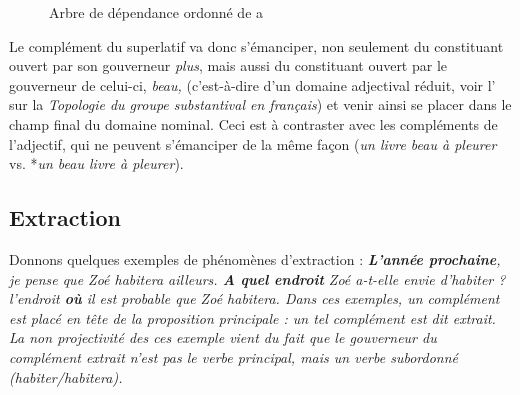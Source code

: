\begin{figure}
\caption{\label{fig:plus}Arbre de dépendance ordonné de a}
\end{figure}

Le complément du superlatif va donc s’émanciper, non seulement du constituant ouvert par son gouverneur \textit{plus}, mais aussi du constituant ouvert par le gouverneur de celui-ci, \textit{beau,} (c’est-à-dire d’un domaine adjectival réduit, voir l’ sur la \textit{Topologie du groupe substantival en français}) et venir ainsi se placer dans le champ final du domaine nominal. Ceci est à contraster avec les compléments de l’adjectif, qui ne peuvent s’émanciper de la même façon (\textit{un livre beau à pleurer} vs. *\textit{un beau livre à pleurer}).

\subsection{Extraction}
Donnons quelques exemples de phénomènes d'extraction :
\ea\label{ex:extraction1}
\ea \itshape \textbf{L’année  prochaine},  je pense que Zoé habitera ailleurs.
\ex \itshape \textbf{A quel endroit}  Zoé a-t-elle envie d’habiter ?
\ex \itshape l’endroit \textbf{où}  il est probable que Zoé habitera.
\z
\z
Dans ces exemples, un complément est placé en tête de la proposition principale : un tel complément est dit extrait. La non projectivité des ces exemple vient du fait que le gouverneur du complément extrait n'est pas le verbe principal, mais un verbe subordonné (\textit{habiter/habitera}).

